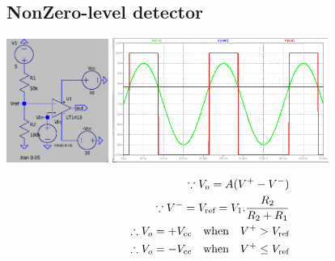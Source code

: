 \documentclass[a4paper, 12pt]{report}
\begin{document}
\begin{center}
\begin{center}
\begin{center}
\begin{center}
\begin{center}
\begin{center}
\begin{center}
\begin{center}
\begin{center}
\begin{center}
\begin{center}
\begin{center}
\subsection{NonZero-level detector}
\begin{center}
\includegraphics[width=0.25\textwidth]{figures/22c.png}\quad\quad
\includegraphics[width=0.53\textwidth]{figures/22w.png}\\
\end{center}
\begin{equation}
    \notag
    \begin{align}
    \because V_o = A(V^{+} - V^{-})\\
    \because V^{-} = V_\text{ref} = V_1 . \frac{R_2}{R_2 + R_1} \\
    \therefore V_o = +V_\text{cc} \quad \text{when} \quad V^{+} > V_\text{ref}\\
    \therefore V_o = -V_\text{cc} \quad \text{when} \quad V^{+} \le V_\text{ref}
    \end{align}
\end{equation}

\end{center}
\end{center}
\end{center}
\end{center}
\end{center}
\end{center}
\end{center}
\end{center}
\end{center}
\end{center}
\end{center}
\end{center}
\end{document}
